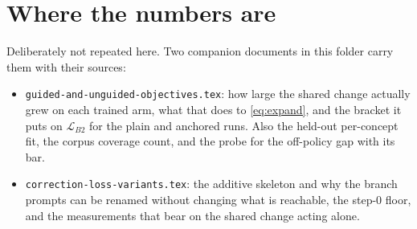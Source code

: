 \documentclass[11pt]{article}
\begin{document}
\section{Where the numbers are}
\label{sec:numbers}

Deliberately not repeated here. Two companion documents in this folder carry them with their
sources:

\begin{itemize}
  \item \texttt{guided-and-unguided-objectives.tex}: how large the shared change actually grew on
    each trained arm, what that does to \eqref{eq:expand}, and the bracket it puts on
    $\mathcal{L}_{B2}$ for the plain and anchored runs. Also the held-out per-concept fit, the
    corpus coverage count, and the probe for the off-policy gap with its bar.
  \item \texttt{correction-loss-variants.tex}: the additive skeleton and why the branch prompts can
    be renamed without changing what is reachable, the step-$0$ floor, and the measurements that
    bear on the shared change acting alone.
\end{itemize}
\end{document}
